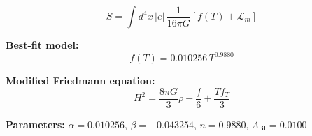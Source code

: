 
\begin{equation}
  S = \int d^4x \, |e| \, \frac{1}{16\pi G} \left[ f(T) + \mathcal{L}_m \right]
\end{equation}

\textbf{Best-fit model:}
\begin{equation}
  f(T) = 0.010256 \, T^{0.9880}
\end{equation}

\textbf{Modified Friedmann equation:}
\begin{equation}
  H^2 = \frac{8\pi G}{3} \rho - \frac{f}{6} + \frac{T f_T}{3}
\end{equation}

\textbf{Parameters:}
$\alpha = 0.010256$, \quad
$\beta = -0.043254$, \quad
$n = 0.9880$, \quad
$\Lambda_{\text{BI}} = 0.0100$
